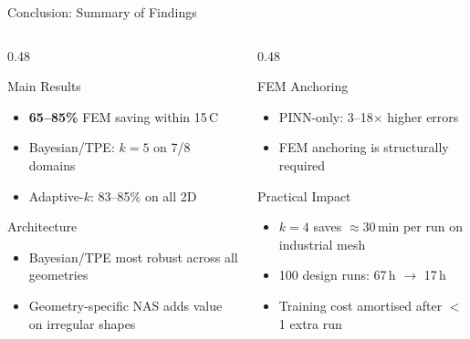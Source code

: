 \documentclass[aspectratio=169, 11pt]{beamer}
\begin{document}
\begin{frame}{Conclusion: Summary of Findings}
  \begin{columns}[t]
    \begin{column}{0.48\textwidth}
      \begin{block}{Main Results}
        \begin{itemize}
          \item \textbf{65--85\%} FEM saving within 15\,\textdegree C
          \item Bayesian/TPE: $k=5$ on 7/8 domains
          \item Adaptive-$k$: 83--85\% on all 2D
        \end{itemize}
      \end{block}
      \vspace{6pt}
      \begin{block}{Architecture}
        \begin{itemize}
          \item Bayesian/TPE most robust across all geometries
          \item Geometry-specific NAS adds value on irregular shapes
        \end{itemize}
      \end{block}
    \end{column}
    \begin{column}{0.48\textwidth}
      \begin{block}{FEM Anchoring}
        \begin{itemize}
          \item PINN-only: 3--18$\times$ higher errors
          \item FEM anchoring is structurally required
        \end{itemize}
      \end{block}
      \vspace{6pt}
      \begin{block}{Practical Impact}
        \begin{itemize}
          \item $k=4$ saves $\approx$30\,min per run on industrial mesh
          \item 100 design runs: 67\,h $\to$ 17\,h
          \item Training cost amortised after $<$1 extra run
        \end{itemize}
      \end{block}
    \end{column}
  \end{columns}
\end{frame}
\end{document}
